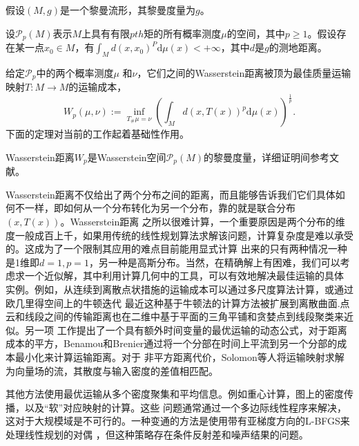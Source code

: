 假设$(M,g)$是一个黎曼流形，其黎曼度量为$g$。

\begin{definition}\label{def:wasserstein space}
    设$\mathcal{P}_p(M)$表示$M$上具有有限$pth$矩的所有概率测度$\mu$的空间，其中$p\ge 1$。假设存在某一点$x_0 \in M$，有$\int _{M} d(x,x_0)^P \mathrm{d}\mu(x) < + \infty$，其中$d$是$g$的测地距离。

    给定$\mathcal{P}_p$中的两个概率测度$\mu$ 和$\nu$，它们之间的Wasserstein距离被顶为最佳质量运输映射$T: M \to M$的运输成本，
    \begin{equation}\label{equation:wasserstein distance}
        W_p(\mu ,\nu ) := \inf _{T_\#\mu = \nu } \left( \int _M d(x,T(x))^p \mathrm{d}\mu (x) \right)^{\frac{1}{p}}. 
    \end{equation}
    下面的定理对当前的工作起着基础性作用。
\end{definition}
\begin{theorem}\label{theorem:Wassertein}
    Wasserstein距离$W_p$是Wasserstein空间$\mathcal{P}_p(M)$的黎曼度量，详细证明间参考文献\cite{villani2003topics}。
\end{theorem}

Wasserstein距离不仅给出了两个分布之间的距离，而且能够告诉我们它们具体如何不一样，即如何从一个分布转化为另一个分布，靠的就是联合分布 $(x,T(x))$。Wasserstein距离
之所以很难计算，一个重要原因是两个分布的维度一般成百上千，如果用传统的线性规划算法求解该问题，计算复杂度是难以承受的。这成为了一个限制其应用的难点目前能用显式计算
出来的只有两种情况一种是1维即$d=1,p=1$，另一种是高斯分布。当然，在精确解上有困难，我们可以考虑求一个近似解，其中利用计算几何中的工具，可以有效地解决最佳运输的具体
实例。例如，从连续到离散点状措施的运输成本可以通过多尺度算法计算\cite{merigot2011multiscale}，或通过欧几里得空间上的牛顿迭代\cite{de2012blue,zhao2013area}
最近这种基于牛顿法的计算方法被扩展到离散曲面\cite{10.1145/2602143}.点云和线段之间的传输距离也在二维中基于平面的三角平铺和贪婪点到线段聚类来近似\cite{de2011optimal}。另一项
工作提出了一个具有额外时间变量的最优运输的动态公式，对于距离成本的平方，Benamou和Brenier\cite{benamou2000computational}通过将一个分部在时间上平流到另一个分部的成本最小化来计算运输距离。对于
非平方距离代价，Solomon等人\cite{solomon2014earth}将运输映射求解为向量场的流，其散度与输入密度的差值相匹配。

其他方法使用最优运输从多个密度聚集和平均信息。例如重心计算\cite{agueh2011barycenters}，图上的密度传播\cite{solomon2014wasserstein}，以及“软”对应映射的计算\cite{solomon2012soft}。这些
问题通常通过一个多边际线性程序来解决\cite{agueh2011barycenters,kim2015multi}，这对于大规模域是不可行的。一种变通的方法是使用带有亚梯度方向的L-BFGS来处理线性规划的对偶\cite{carlier2015numerical}
，但这种策略存在条件反射差和噪声结果的问题。

